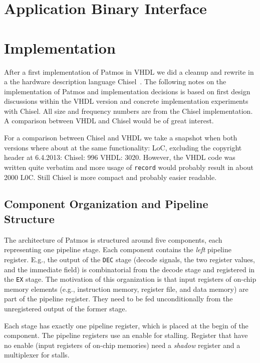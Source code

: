 \documentclass[a4paper,fontsize=10pt,twoside,DIV15,BCOR12mm,headinclude=true,footinclude=false,pagesize,bibtotoc]{scrbook}
\newcommand{\code}[1]{{\texttt{#1}}}
\newcommand{\comment}[3]{

\textsf{\textbf{#1}} {\color{#3}#2}}
\newcommand{\martin}[1]{\comment{Martin}{#1}{Blue}}
\renewcommand{\martin}[1]{}
\begin{document}
\chapter{Application Binary Interface}
\label{sec:abi}




\chapter{Implementation}

\martin{This sections shall describe implementation details,
decisions, and options.}

After a first implementation of Patmos in VHDL we did a cleanup and
rewrite in a the hardware description language Chisel~\cite{chisel:dac2012}.
The following notes on the implementation of Patmos and implementation
decisions is based on first design discussions within the VHDL version
and concrete implementation experiments with Chisel. All size and frequency
numbers are from the Chisel implementation. A comparison between VHDL
and Chisel would be of great interest.

For a comparison between Chisel and VHDL we take a snapshot when both
versions where about at the same functionality: LoC, excluding the copyright
header at 6.4.2013: Chisel: 996 VHDL: 3020. However, the VHDL code was
written quite verbatim and more usage of \code{record} would probably result
in about 2000 L0C. Still Chisel is more compact and probably easier readable.


\section{Component Organization and Pipeline Structure}

The architecture of Patmos is structured around five components, each
representing one pipeline stage. Each component contains the \emph{left}
pipeline register. E.g., the output of the \code{DEC} stage (decode signals,
the two register values, and the immediate field) is combinatorial from
the decode stage and registered in the \code{EX} stage. The motivation of
this organization is that input registers of on-chip memory elements (e.g., instruction
memory, register file, and data memory) are part of the pipeline register.
They need to be fed unconditionally from the unregistered output of
the former stage.

Each stage has exactly one pipeline register, which is placed at the begin
of the component. The pipeline registers use an enable for stalling.
Register that have no enable (input registers of on-chip memories) need
a \emph{shadow} register and a multiplexer for stalls.
\end{document}
